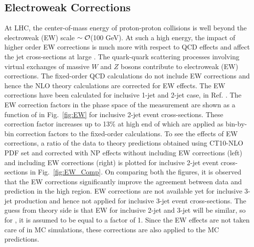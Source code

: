 \subsection{Electroweak Corrections}
\label{sec:EW}
At LHC, the center-of-mass energy of proton-proton collisions is well beyond the electroweak (EW) scale $\sim{\cal O}$(100 GeV). At such a high energy, the impact of higher order EW corrections is much more with respect to QCD effects \cite{Hollik:2004dz} and affect the jet cross-sections at large \httwo. The quark-quark scattering processes involving virtual exchanges of massive $W$ and $Z$ bosons contribute to electroweak (EW) corrections. The fixed-order QCD calculations do not include EW corrections and hence the NLO theory calculations are corrected for EW effects. The EW corrections have been calculated for inclusive 1-jet and 2-jet case, in Ref. \cite{Dittmaier:2012kx}. The EW correction factors in the phase space of the measurement are shown as a function of \httwo in Fig.~\ref{fig:EW} for inclusive 2-jet event cross-sections. These correction factor increases up to 13\% at high end of \httwo which are applied as bin-by-bin correction factors to the fixed-order \NLOJETPP calculations. To see the effects of EW corrections, a ratio of the data to theory predictions obtained using CT10-NLO PDF set and corrected with NP effects without including EW corrections (left) and including EW corrections (right) is plotted for inclusive 2-jet event cross-sections in Fig.~\ref{fig:EW_Comp}. On comparing both the figures, it is observed that the EW corrections significantly improve the agreement between data and prediction in the high \httwo region. EW corrections are not available yet for inclusive 3-jet production and hence not applied for inclusive 3-jet event cross-sections. The guess from theory side is that EW for inclusive 2-jet and 3-jet will be similar, so for \ratio, it is assumed to be equal to a factor of 1. Since the EW effects are not taken care of in MC simulations, these corrections are also applied to the MC predictions. 

